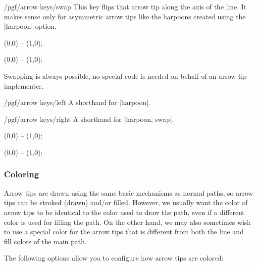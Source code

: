 \begin{key}{/pgf/arrow keys/swap}
    This key flips that arrow tip along the axis of the line. It makes sense
    only for asymmetric arrow tips like the harpoons created using the
    |harpoon| option.
\begin{codeexample}[width=3cm,preamble={\usetikzlibrary{arrows.meta}}]
 \draw [arrows = {-Stealth[harpoon]}] (0,0) -- (1,0);
\end{codeexample}
\begin{codeexample}[width=3cm,preamble={\usetikzlibrary{arrows.meta}}]
 \draw [arrows = {-Stealth[harpoon,swap]}] (0,0) -- (1,0);
\end{codeexample}
    Swapping is always possible, no special code is needed on behalf of an
    arrow tip implementer.
\end{key}

\begin{key}{/pgf/arrow keys/left}
    A shorthand for |harpoon|.
\end{key}

\begin{key}{/pgf/arrow keys/right}
    A shorthand for |harpoon, swap|.
\begin{codeexample}[width=3cm,preamble={\usetikzlibrary{arrows.meta}}]
 \draw [arrows = {-Stealth[left]}] (0,0) -- (1,0);
\end{codeexample}
\begin{codeexample}[width=3cm,preamble={\usetikzlibrary{arrows.meta}}]
 \draw [arrows = {-Stealth[right]}] (0,0) -- (1,0);
\end{codeexample}
\end{key}


\subsubsection{Coloring}

Arrow tips are drawn using the same basic mechanisms as normal paths, so arrow
tips can be stroked (drawn) and/or filled. However, we usually want the color
of arrow tips to be identical to the color used to draw the path, even if a
different color is used for filling the path. On the other hand, we may also
sometimes wish to use a special color for the arrow tips that is different from
both the line and fill colors of the main path.

The following options allow you to configure how arrow tips are colored:

